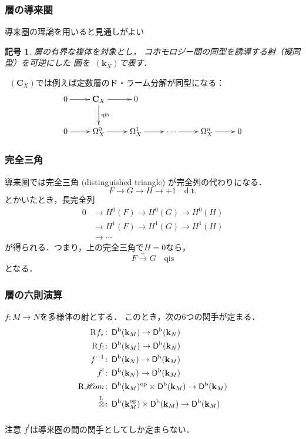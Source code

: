 \documentclass[dvipdfmx,10pt,aspectratio=169,leqno]{beamer}%
\newcommand{\cc}{\mathbf{C}}
\newcommand{\kk}{\mathbf{k}}
\newcommand{\op}{{\rm op}} %
\numberwithin{equation}{subsection}
\newcommand{\Dompb}{\mathop{\mathsf{D}^\mathrm{b}}\nolimits}
\newcommand{\HOM}{\mathop{\mathscr{H}\hspace{-2pt}om}\nolimits}%
\newcommand{\RHOM}{\mathop{\mathrm{R}\hspace{-1.5pt}\HOM}\nolimits}
\newcommand{\Rder}{\mathrm{R}}
\newcommand{\simarr}{\mathrel{\overset{\sim}{\longrightarrow}}}%
\newcommand{\tens}[1][]{\mathbin{\otimes_{\raise1.5ex\hbox to-.1em{}{#1}}}}
\newcommand{\lltens}[1][]{{\mathop{\tens}\limits^{\mathrm{L}}_{#1}}}
\theoremstyle{mystyle}
\newtheorem{NTN}[AXM]{記号}
\begin{document}
\begin{frame}
    \frametitle{層の導来圏}
    導来圏の理論を用いると見通しがよい
    \begin{NTN}
        層の有界な複体を対象とし，
        コホモロジー間の同型を誘導する射（擬同型）を可逆にした
        圏を\(\Dompb(\kk_X)\)で表す．
    \end{NTN}
    \(\Dompb(\cc_X)\)では例えば定数層のド・ラーム分解が同型になる：
    \[\vcenter{\xymatrix{
        0\ar[r]&
        \cc_X \ar[r] \ar[d]^-{\mathrm{qis}}&
        0\\
        0\ar[r]&
        \Omega_X^0\ar[r]&
        \Omega_X^1\ar[r]&
        \cdots\ar[r]&
        \Omega_X^n\ar[r]&0
    }}\]
\end{frame}

\begin{frame}
    \frametitle{完全三角}
    導来圏では完全三角 (distinguished triangle) が完全列の代わりになる．
    \[
        F\to G\to H\to+1\quad\mathrm{d.t.}
    \]
    とかいたとき，長完全列
    \begin{align*}
        0&\to H^0(F)\to H^0(G)\to H^0(H)\\
        &\to H^1(F)\to H^1(G)\to H^1(H)\\
        &\to \cdots
    \end{align*}
    が得られる．つまり，上の完全三角で\(H=0\)なら，
    \[
    F\simarr G\quad \mathrm{qis}
    \]となる．
\end{frame}



\begin{frame}
    \frametitle{層の六則演算}
    \(f\colon M\to N\)を多様体の射とする．
    このとき，次の6つの関手が定まる．
    \begin{align*}
        \Rder{f_\ast}&\colon\Dompb(\kk_M)\to\Dompb(\kk_N)\\
        \Rder{f_!}&\colon\Dompb(\kk_M)\to\Dompb(\kk_N)\\
        f^{-1}&\colon\Dompb(\kk_N)\to\Dompb(\kk_M)\\
        f^{!}&\colon\Dompb(\kk_N)\to\Dompb(\kk_M)\\
        \RHOM&\colon\Dompb(\kk_M)^{\op}\times\Dompb(\kk_M)\to\Dompb(\kk_M)\\
        \lltens[]&\colon\Dompb(\kk_M^{\op})\times\Dompb(\kk_M)\to\Dompb(\kk_M)
    \end{align*}
    \begin{alertblock}{注意}
        \(f^!\)は導来圏の間の関手としてしか定まらない．        
    \end{alertblock}
\end{frame}
\end{document}
